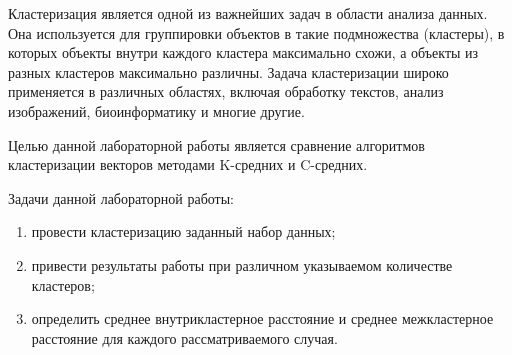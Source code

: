 
Кластеризация является одной из важнейших задач в области анализа данных. Она используется для группировки объектов в такие подмножества (кластеры), в которых объекты внутри каждого кластера максимально схожи, а объекты из разных кластеров максимально различны. Задача кластеризации широко применяется в различных областях, включая обработку текстов, анализ изображений, биоинформатику и многие другие.

Целью данной лабораторной работы является сравнение алгоритмов кластеризации векторов методами K-средних и C-средних.

Задачи данной лабораторной работы:
\begin{enumerate}[label*=\arabic*)]
	\item провести кластеризацию заданный набор данных;
	\item привести результаты работы при различном указываемом количестве кластеров;
	\item определить среднее внутрикластерное расстояние и среднее межкластерное расстояние для каждого рассматриваемого случая.
\end{enumerate}

\clearpage
